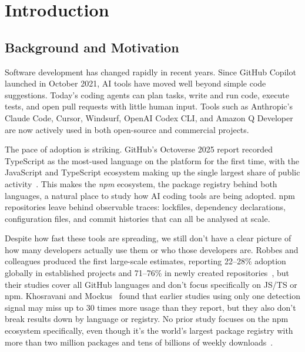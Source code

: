 
\chapter{Introduction}
\label{chap:intro}

\section{Background and Motivation}
\label{sec:intro:background}

Software development has changed rapidly in recent years. Since GitHub Copilot
launched in October 2021, AI tools have moved well beyond simple code
suggestions. Today's coding agents can plan tasks, write and run code, execute
tests, and open pull requests with little human input. Tools such as
Anthropic's Claude Code, Cursor, Windsurf, OpenAI Codex CLI, and Amazon Q
Developer are now actively used in both open-source and commercial projects.

The pace of adoption is striking. GitHub's Octoverse 2025 report recorded
TypeScript as the most-used language on the platform for the first time, with
the JavaScript and TypeScript ecosystem making up the single largest share of
public activity~\cite{octoverse2025}. This makes the \emph{npm}
ecosystem, the package registry behind both languages, a natural place to
study how AI coding tools are being adopted. npm repositories leave behind
observable traces: lockfiles, dependency declarations, configuration files,
and commit histories that can all be analysed at scale.

Despite how fast these tools are spreading, we still don't have a clear
picture of how many developers actually use them or who those developers are.
Robbes and colleagues produced the first large-scale estimates, reporting
22--28\% adoption globally in established projects and 71--76\% in newly
created repositories~\cite{robbesAgenticMuch2026, robbesAgenticVery2026},
but their studies cover all GitHub languages and don't focus specifically on
JS/TS or npm. Khosravani and Mockus~\cite{khosravani2026} found that earlier
studies using only one detection signal may miss up to 30 times more usage
than they report, but they also don't break results down by language or
registry. No prior study focuses on the npm ecosystem specifically, even
though it's the world's largest package registry with more than two million
packages and tens of billions of weekly downloads~\cite{octoverse2025}.

